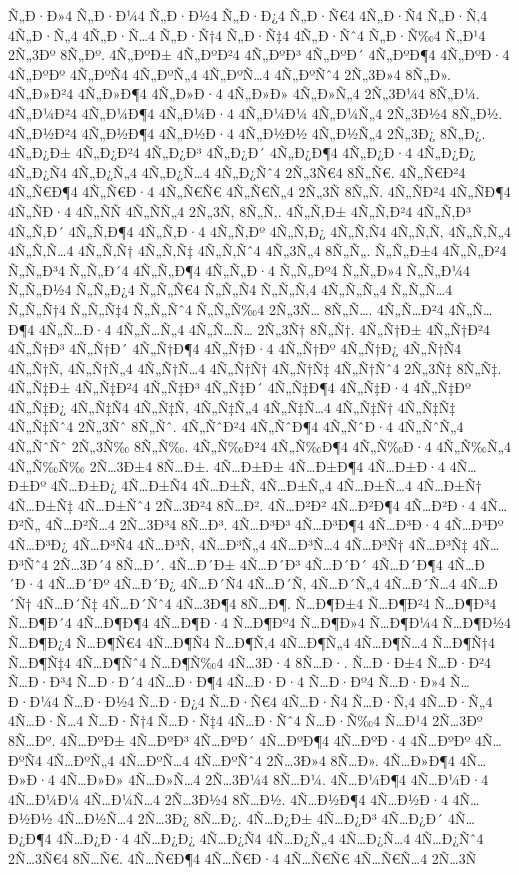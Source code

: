 {Ñ„Ð·Ð»4
Ñ„Ð·Ð¼4
Ñ„Ð·Ð½4
Ñ„Ð·Ð¿4
Ñ„Ð·Ñ€4
4Ñ„Ð·Ñ4
Ñ„Ð·Ñ‚4
4Ñ„Ð·Ñ„4
4Ñ„Ð·Ñ…4
Ñ„Ð·Ñ†4
Ñ„Ð·Ñ‡4
4Ñ„Ð·Ñˆ4
Ñ„Ð·Ñ‰4
Ñ„Ð¹4
2Ñ„3Ðº
8Ñ„Ðº.
4Ñ„ÐºÐ±
4Ñ„ÐºÐ²4
4Ñ„ÐºÐ³
4Ñ„ÐºÐ´
4Ñ„ÐºÐ¶4
4Ñ„ÐºÐ·4
4Ñ„ÐºÐº
4Ñ„ÐºÑ4
4Ñ„ÐºÑ„4
4Ñ„ÐºÑ…4
4Ñ„ÐºÑˆ4
2Ñ„3Ð»4
8Ñ„Ð».
4Ñ„Ð»Ð²4
4Ñ„Ð»Ð¶4
4Ñ„Ð»Ð·4
4Ñ„Ð»Ð»
4Ñ„Ð»Ñ„4
2Ñ„3Ð¼4
8Ñ„Ð¼.
4Ñ„Ð¼Ð²4
4Ñ„Ð¼Ð¶4
4Ñ„Ð¼Ð·4
4Ñ„Ð¼Ð¼
4Ñ„Ð¼Ñ„4
2Ñ„3Ð½4
8Ñ„Ð½.
4Ñ„Ð½Ð²4
4Ñ„Ð½Ð¶4
4Ñ„Ð½Ð·4
4Ñ„Ð½Ð½
4Ñ„Ð½Ñ„4
2Ñ„3Ð¿
8Ñ„Ð¿.
4Ñ„Ð¿Ð±
4Ñ„Ð¿Ð²4
4Ñ„Ð¿Ð³
4Ñ„Ð¿Ð´
4Ñ„Ð¿Ð¶4
4Ñ„Ð¿Ð·4
4Ñ„Ð¿Ð¿
4Ñ„Ð¿Ñ4
4Ñ„Ð¿Ñ„4
4Ñ„Ð¿Ñ…4
4Ñ„Ð¿Ñˆ4
2Ñ„3Ñ€4
8Ñ„Ñ€.
4Ñ„Ñ€Ð²4
4Ñ„Ñ€Ð¶4
4Ñ„Ñ€Ð·4
4Ñ„Ñ€Ñ€
4Ñ„Ñ€Ñ„4
2Ñ„3Ñ
8Ñ„Ñ.
4Ñ„ÑÐ²4
4Ñ„ÑÐ¶4
4Ñ„ÑÐ·4
4Ñ„ÑÑ
4Ñ„ÑÑ„4
2Ñ„3Ñ‚
8Ñ„Ñ‚.
4Ñ„Ñ‚Ð±
4Ñ„Ñ‚Ð²4
4Ñ„Ñ‚Ð³
4Ñ„Ñ‚Ð´
4Ñ„Ñ‚Ð¶4
4Ñ„Ñ‚Ð·4
4Ñ„Ñ‚Ðº
4Ñ„Ñ‚Ð¿
4Ñ„Ñ‚Ñ4
4Ñ„Ñ‚Ñ‚
4Ñ„Ñ‚Ñ„4
4Ñ„Ñ‚Ñ…4
4Ñ„Ñ‚Ñ†
4Ñ„Ñ‚Ñ‡
4Ñ„Ñ‚Ñˆ4
4Ñ„3Ñ„4
8Ñ„Ñ„.
Ñ„Ñ„Ð±4
4Ñ„Ñ„Ð²4
Ñ„Ñ„Ð³4
Ñ„Ñ„Ð´4
4Ñ„Ñ„Ð¶4
4Ñ„Ñ„Ð·4
Ñ„Ñ„Ðº4
Ñ„Ñ„Ð»4
Ñ„Ñ„Ð¼4
Ñ„Ñ„Ð½4
Ñ„Ñ„Ð¿4
Ñ„Ñ„Ñ€4
Ñ„Ñ„Ñ4
Ñ„Ñ„Ñ‚4
4Ñ„Ñ„Ñ„4
Ñ„Ñ„Ñ…4
Ñ„Ñ„Ñ†4
Ñ„Ñ„Ñ‡4
Ñ„Ñ„Ñˆ4
Ñ„Ñ„Ñ‰4
2Ñ„3Ñ…
8Ñ„Ñ….
4Ñ„Ñ…Ð²4
4Ñ„Ñ…Ð¶4
4Ñ„Ñ…Ð·4
4Ñ„Ñ…Ñ„4
4Ñ„Ñ…Ñ…
2Ñ„3Ñ†
8Ñ„Ñ†.
4Ñ„Ñ†Ð±
4Ñ„Ñ†Ð²4
4Ñ„Ñ†Ð³
4Ñ„Ñ†Ð´
4Ñ„Ñ†Ð¶4
4Ñ„Ñ†Ð·4
4Ñ„Ñ†Ðº
4Ñ„Ñ†Ð¿
4Ñ„Ñ†Ñ4
4Ñ„Ñ†Ñ‚
4Ñ„Ñ†Ñ„4
4Ñ„Ñ†Ñ…4
4Ñ„Ñ†Ñ†
4Ñ„Ñ†Ñ‡
4Ñ„Ñ†Ñˆ4
2Ñ„3Ñ‡
8Ñ„Ñ‡.
4Ñ„Ñ‡Ð±
4Ñ„Ñ‡Ð²4
4Ñ„Ñ‡Ð³
4Ñ„Ñ‡Ð´
4Ñ„Ñ‡Ð¶4
4Ñ„Ñ‡Ð·4
4Ñ„Ñ‡Ðº
4Ñ„Ñ‡Ð¿
4Ñ„Ñ‡Ñ4
4Ñ„Ñ‡Ñ‚
4Ñ„Ñ‡Ñ„4
4Ñ„Ñ‡Ñ…4
4Ñ„Ñ‡Ñ†
4Ñ„Ñ‡Ñ‡
4Ñ„Ñ‡Ñˆ4
2Ñ„3Ñˆ
8Ñ„Ñˆ.
4Ñ„ÑˆÐ²4
4Ñ„ÑˆÐ¶4
4Ñ„ÑˆÐ·4
4Ñ„ÑˆÑ„4
4Ñ„ÑˆÑˆ
2Ñ„3Ñ‰
8Ñ„Ñ‰.
4Ñ„Ñ‰Ð²4
4Ñ„Ñ‰Ð¶4
4Ñ„Ñ‰Ð·4
4Ñ„Ñ‰Ñ„4
4Ñ„Ñ‰Ñ‰
2Ñ…3Ð±4
8Ñ…Ð±.
4Ñ…Ð±Ð±
4Ñ…Ð±Ð¶4
4Ñ…Ð±Ð·4
4Ñ…Ð±Ðº
4Ñ…Ð±Ð¿
4Ñ…Ð±Ñ4
4Ñ…Ð±Ñ‚
4Ñ…Ð±Ñ„4
4Ñ…Ð±Ñ…4
4Ñ…Ð±Ñ†
4Ñ…Ð±Ñ‡
4Ñ…Ð±Ñˆ4
2Ñ…3Ð²4
8Ñ…Ð².
4Ñ…Ð²Ð²
4Ñ…Ð²Ð¶4
4Ñ…Ð²Ð·4
4Ñ…Ð²Ñ„
4Ñ…Ð²Ñ…4
2Ñ…3Ð³4
8Ñ…Ð³.
4Ñ…Ð³Ð³
4Ñ…Ð³Ð¶4
4Ñ…Ð³Ð·4
4Ñ…Ð³Ðº
4Ñ…Ð³Ð¿
4Ñ…Ð³Ñ4
4Ñ…Ð³Ñ‚
4Ñ…Ð³Ñ„4
4Ñ…Ð³Ñ…4
4Ñ…Ð³Ñ†
4Ñ…Ð³Ñ‡
4Ñ…Ð³Ñˆ4
2Ñ…3Ð´4
8Ñ…Ð´.
4Ñ…Ð´Ð±
4Ñ…Ð´Ð³
4Ñ…Ð´Ð´
4Ñ…Ð´Ð¶4
4Ñ…Ð´Ð·4
4Ñ…Ð´Ðº
4Ñ…Ð´Ð¿
4Ñ…Ð´Ñ4
4Ñ…Ð´Ñ‚
4Ñ…Ð´Ñ„4
4Ñ…Ð´Ñ…4
4Ñ…Ð´Ñ†
4Ñ…Ð´Ñ‡
4Ñ…Ð´Ñˆ4
4Ñ…3Ð¶4
8Ñ…Ð¶.
Ñ…Ð¶Ð±4
Ñ…Ð¶Ð²4
Ñ…Ð¶Ð³4
Ñ…Ð¶Ð´4
4Ñ…Ð¶Ð¶4
4Ñ…Ð¶Ð·4
Ñ…Ð¶Ðº4
Ñ…Ð¶Ð»4
Ñ…Ð¶Ð¼4
Ñ…Ð¶Ð½4
Ñ…Ð¶Ð¿4
Ñ…Ð¶Ñ€4
4Ñ…Ð¶Ñ4
Ñ…Ð¶Ñ‚4
4Ñ…Ð¶Ñ„4
4Ñ…Ð¶Ñ…4
Ñ…Ð¶Ñ†4
Ñ…Ð¶Ñ‡4
4Ñ…Ð¶Ñˆ4
Ñ…Ð¶Ñ‰4
4Ñ…3Ð·4
8Ñ…Ð·.
Ñ…Ð·Ð±4
Ñ…Ð·Ð²4
Ñ…Ð·Ð³4
Ñ…Ð·Ð´4
4Ñ…Ð·Ð¶4
4Ñ…Ð·Ð·4
Ñ…Ð·Ðº4
Ñ…Ð·Ð»4
Ñ…Ð·Ð¼4
Ñ…Ð·Ð½4
Ñ…Ð·Ð¿4
Ñ…Ð·Ñ€4
4Ñ…Ð·Ñ4
Ñ…Ð·Ñ‚4
4Ñ…Ð·Ñ„4
4Ñ…Ð·Ñ…4
Ñ…Ð·Ñ†4
Ñ…Ð·Ñ‡4
4Ñ…Ð·Ñˆ4
Ñ…Ð·Ñ‰4
Ñ…Ð¹4
2Ñ…3Ðº
8Ñ…Ðº.
4Ñ…ÐºÐ±
4Ñ…ÐºÐ³
4Ñ…ÐºÐ´
4Ñ…ÐºÐ¶4
4Ñ…ÐºÐ·4
4Ñ…ÐºÐº
4Ñ…ÐºÑ4
4Ñ…ÐºÑ„4
4Ñ…ÐºÑ…4
4Ñ…ÐºÑˆ4
2Ñ…3Ð»4
8Ñ…Ð».
4Ñ…Ð»Ð¶4
4Ñ…Ð»Ð·4
4Ñ…Ð»Ð»
4Ñ…Ð»Ñ…4
2Ñ…3Ð¼4
8Ñ…Ð¼.
4Ñ…Ð¼Ð¶4
4Ñ…Ð¼Ð·4
4Ñ…Ð¼Ð¼
4Ñ…Ð¼Ñ…4
2Ñ…3Ð½4
8Ñ…Ð½.
4Ñ…Ð½Ð¶4
4Ñ…Ð½Ð·4
4Ñ…Ð½Ð½
4Ñ…Ð½Ñ…4
2Ñ…3Ð¿
8Ñ…Ð¿.
4Ñ…Ð¿Ð±
4Ñ…Ð¿Ð³
4Ñ…Ð¿Ð´
4Ñ…Ð¿Ð¶4
4Ñ…Ð¿Ð·4
4Ñ…Ð¿Ð¿
4Ñ…Ð¿Ñ4
4Ñ…Ð¿Ñ„4
4Ñ…Ð¿Ñ…4
4Ñ…Ð¿Ñˆ4
2Ñ…3Ñ€4
8Ñ…Ñ€.
4Ñ…Ñ€Ð¶4
4Ñ…Ñ€Ð·4
4Ñ…Ñ€Ñ€
4Ñ…Ñ€Ñ…4
2Ñ…3Ñ
}
